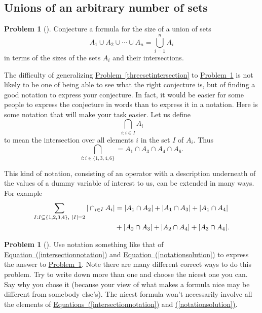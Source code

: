 \documentclass[10pt,]{book}
\theoremstyle{plain}
\theoremstyle{definition}
\newtheorem{activity}[project]{Problem}
\theoremstyle{definition}
\numberwithin{equation}{chapter}
\newcommand{\amp}{&}
\begin{document}
\subsection[{Unions of an arbitrary number of sets}]{Unions of an arbitrary number of sets}\label{subsection-52}
\begin{activity}[] \label{nsetintersection}
Conjecture a formula for the size of a union of sets%
\begin{equation*}
A_1\cup
A_2\cup \cdots\cup A_n = \bigcup_{i=1}^n A_i
\end{equation*}
in terms of the sizes of the sets \(A_i\) and their intersections.%
\end{activity}
The difficulty of generalizing \hyperref[threesetintersection]{Problem~\ref{threesetintersection}} to \hyperref[nsetintersection]{Problem~\ref{nsetintersection}} is not likely to be one of being able to see what the right conjecture is, but of finding a good notation to express your conjecture. In fact, it would be easier for some people to express the conjecture in words than to express it in a notation. Here is some notation that will make your task easier. Let us define%
\begin{equation*}
\bigcap_{i:i\in I}A_i
\end{equation*}
to mean the intersection over all elements \(i\) in the set \(I\) of \(A_i\). Thus%
\begin{equation}
\bigcap_{i:i\in
\{1,3,4,6\}} = A_1\cap A_3\cap A_4 \cap A_6.\label{intersectionnotation}
\end{equation}
%
\par
This kind of notation, consisting of an operator with a description underneath of the values of a dummy variable of interest to us, can be extended in many ways. For example%
\begin{align}
\sum_{I:I \subseteq \{1,2,3,4\}, \ |I|=2} |\cap_{i\in I}
A_i|  \amp =  |A_1\cap A_2|+ |A_1\cap A_3|
+|A_1\cap A_4|\notag\\
\amp +  |A_2\cap A_3|+
|A_2\cap A_4| +|A_3\cap A_4|.\label{notationsolution}
\end{align}
%
\begin{activity}[] \label{inclusion-exclusionunion}
Use notation something like that of \hyperref[intersectionnotation]{Equation~(\ref{intersectionnotation})} and \hyperref[notationsolution]{Equation~(\ref{notationsolution})} to express the answer to \hyperref[nsetintersection]{Problem~\ref{nsetintersection}}. Note there are many different correct ways to do this problem. Try to write down more than one and choose the nicest one you can. Say why you chose it (because your view of what makes a formula nice may be different from somebody else's). The nicest formula won't necessarily involve all the elements of \hyperref[intersectionnotation]{Equations~(\ref{intersectionnotation})} and \hyperref[notationsolution]{(\ref{notationsolution})}.%
\end{activity}
\end{document}
